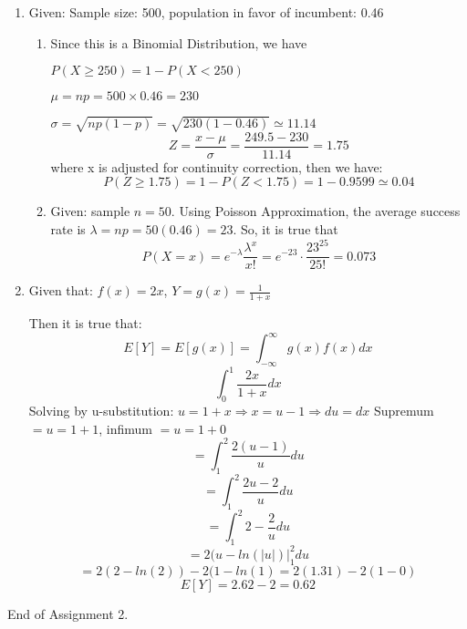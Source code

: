 \documentclass[12pt]{article}
\begin{document}
\begin{enumerate}
		\item Given: Sample size: 500, population in favor of incumbent: 0.46
			\begin{enumerate}
				\item Since this is a Binomial Distribution, we have

				$P(X \geq 250) = 1 - P(X < 250)$
				
				$\mu = np = 500 \times 0.46 = 230$
				
				$\sigma = \sqrt{np(1-p)} = \sqrt{230(1-0.46)} \simeq 11.14$
				$$Z = \frac{x - \mu}{\sigma} = \frac{249.5 - 230}{11.14} = 1.75$$
				where x is adjusted for continuity correction, then we have:
				$$P(Z \geq 1.75) = 1 - P(Z < 1.75) = 1 - 0.9599 \simeq 0.04$$
				
				\item Given: sample $n = 50$. Using Poisson Approximation, the average success rate is $\lambda = np = 50(0.46) = 23$. So, it is true that
				$$P(X = x) = e^{-\lambda} \frac{\lambda^x}{x!} = e^{-23} \cdot \frac{23^{25}}{25!} = 0.073$$
				
				
				
				
				
			\end{enumerate}
			
		\item Given that: $f(x) = 2x$, $Y = g(x) = \frac{1}{1 + x}$
			
			Then it is true that:
			$$E[Y] = E[g(x)] = \int_{-\infty}^{\infty} g(x)f(x)dx$$
			$$\int_{0}^{1} \frac{2x}{1 + x}dx$$
			Solving by u-substitution: $u = 1 + x \Rightarrow x = u - 1 \Rightarrow du = dx$
			Supremum $= u = 1 + 1$, infimum $= u = 1 + 0$
			$$= \int_{1}^{2} \frac{2(u-1)}{u}du$$
			$$= \int_{1}^{2} \frac{2u-2}{u}du$$
			$$= \int_{1}^{2} 2 - \frac{2}{u}du$$
			$$= 2(u - ln(|u|)\vert_{1}^{2}du$$
			$$= 2(2 - ln(2)) - 2(1 - ln(1) = 2(1.31) - 2(1 - 0)$$
			$$E[Y] = 2.62 - 2 = 0.62$$
\end{enumerate}

End of Assignment 2.
\end{document}
